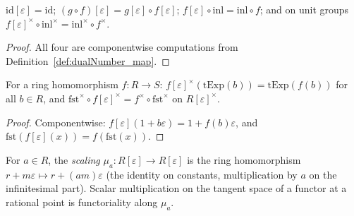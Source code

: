 \begin{lemma}
  \label{lem:dualNumber_map_functorial}
  \leanok
  \(\mathrm{id}[\varepsilon] = \mathrm{id}\);
  \((g \circ f)[\varepsilon] = g[\varepsilon] \circ f[\varepsilon]\);
  \(f[\varepsilon] \circ \mathrm{inl} = \mathrm{inl} \circ f\); and on unit groups
  \(f[\varepsilon]^\times \circ \mathrm{inl}^\times = \mathrm{inl}^\times \circ
  f^\times\).
\end{lemma}
\begin{proof}
  \leanok
  All four are componentwise computations from Definition~\ref{def:dualNumber_map}.
\end{proof}

\begin{lemma}
  \label{lem:truncExp_naturality}
  \leanok
  For a ring homomorphism \(f : R \to S\):
  \(f[\varepsilon]^\times(\mathrm{tExp}(b)) = \mathrm{tExp}(f(b))\) for all
  \(b \in R\), and
  \(\mathrm{fst}^\times \circ f[\varepsilon]^\times = f^\times \circ
  \mathrm{fst}^\times\) on \(R[\varepsilon]^\times\).
\end{lemma}
\begin{proof}
  \leanok
  Componentwise: \(f[\varepsilon](1 + b\varepsilon) = 1 + f(b)\varepsilon\), and
  \(\mathrm{fst}(f[\varepsilon](x)) = f(\mathrm{fst}(x))\).
\end{proof}

\begin{definition}
  \label{def:mumford_scaling}
  \leanok
  For \(a \in R\), the \emph{scaling} \(\mu_a : R[\varepsilon] \to R[\varepsilon]\) is
  the ring homomorphism \(r + m\varepsilon \mapsto r + (am)\varepsilon\) (the identity
  on constants, multiplication by \(a\) on the infinitesimal part). Scalar
  multiplication on the tangent space of a functor at a rational point is
  functoriality along \(\mu_a\).
\end{definition}

